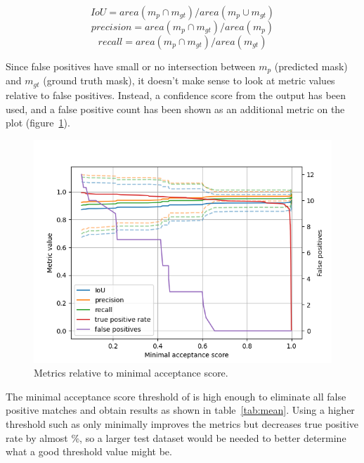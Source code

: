 \documentclass[9pt]{IEEEtran}
\begin{document}
\[ IoU = area(m_{p} \cap m_{gt}) / area(m_{p} \cup m_{gt}) \]
\[ precision = area(m_{p} \cap m_{gt}) / area(m_{p}) \]
\[ recall = area(m_{p} \cap m_{gt}) / area(m_{gt}) \]

Since false positives have small or no intersection between \(m_{p}\) (predicted mask) and \(m_{gt}\) (ground truth mask), it doesn't make sense to look at metric values relative to false positives. Instead, a confidence score from the output has been used, and a false positive count has been shown as an additional metric on the plot (figure~\ref{fig:score}).

\begin{figure}[h]
    \centering
    \includegraphics[width=1\columnwidth]{score.png}
    \caption{Metrics relative to minimal acceptance score.}
    \label{fig:score}
\end{figure}

The minimal acceptance score threshold of  is high enough to eliminate all false positive matches and obtain results as shown in table~\ref{tab:mean}. Using a higher threshold such as  only minimally improves the metrics but decreases true positive rate by almost \%, so a larger test dataset would be needed to better determine what a good threshold value might be.
\end{document}
